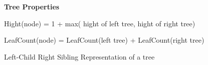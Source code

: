 
\centerline{\textbf{ \LARGE Tree Properties}}

 Hight(node) = 1 + max( hight of left tree, hight of right tree)

 LeafCount(node) = LeafCount(left tree) + LeafCount(right tree)

 Left-Child Right Sibling Representation of a tree


